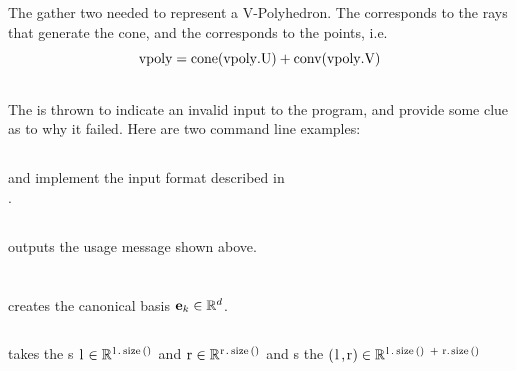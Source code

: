 \subsection{}
The  gather two  needed to represent a V-Polyhedron.  The  corresponds to the rays that generate the cone, and the  corresponds to the points, i.e.
\[ \mli{vpoly} = \cone(\mli{vpoly.U}) + \conv(\mli{vpoly.V}) \]
\lstVPoly

\subsection{}
The  is thrown to indicate an invalid input to the program, and provide some clue as to why it failed.  Here are two command line examples:

\lstinputerror

\subsection{}
 and  implement the input format described in \\.
\lstissV
\lstossV

\subsection{}
 outputs the usage message shown above.
\lstusage

\section{}

\subsection{}
 creates the canonical basis  $\mathbf{e}_k \in \mathbb{R}^d$.
\lstek

\subsection{}
 takes the s $\mli{l} \in \R^{\mli{l.size()}}$ and $\mli{r} \in \R^{\mli{r.size()}}$ and s the  $(\mli{l,r}) \in \R^{\mli{l.size() + r.size()}}$
\lstconcatenate

